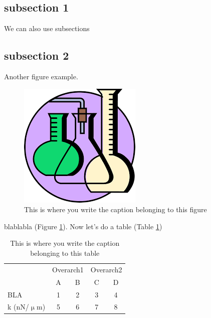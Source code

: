 \begin{refsection}
\subsection{subsection 1}
We can also use subsections 


\subsection{subsection 2}
Another figure example.

\begin{figure}
\begin{center}
\includegraphics[width=0.7\columnwidth]{./C2_Topic1/figure_2/fig2.png}
\caption{\label{fig:LABELFORFIG2_2} This is where you write the caption belonging to this figure}
\end{center}
\end{figure}


blablabla (Figure \ref{fig:LABELFORFIG2_2}). Now let's do a table (Table \ref{tab:LABELFORTBL2_1})

\begin{table}[H]
\centering
\begin{tabular}{l c c | c c}
 	& 	\multicolumn{2}{c}{Overarch1}   		& \multicolumn{2}{c}{Overarch2} \\
 	& A & B 	& C & D \\
\cline{2-5}
BLA & 1 & 2 & 3 & 4 \\
k (nN/$\upmu$m) & 5 & 6 & 7 & 8 \\
\cline{2-5}
\end{tabular}

\caption{\label{tab:LABELFORTBL2_1}This is where you write the caption belonging to this table}
\end{table}

\newpage
\printbibliography[title={Bibliography}]
\end{refsection}


